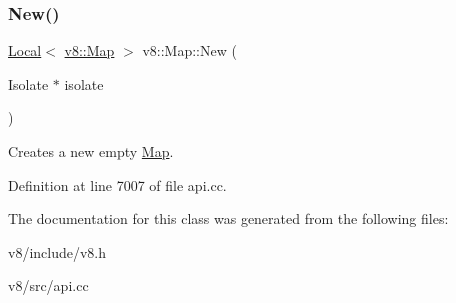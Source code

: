 \mbox{\label{classv8_1_1Map_a4126e8c0d6127119157986f1316380c2}} 
\subsubsection{\texorpdfstring{New()}{New()}}
{\footnotesize\ttfamily \mbox{\hyperlink{classv8_1_1Local}{Local}}$<$ \mbox{\hyperlink{classv8_1_1Map}{v8\+::\+Map}} $>$ v8\+::\+Map\+::\+New (\begin{DoxyParamCaption}\item[{Isolate $\ast$}]{isolate }\end{DoxyParamCaption})\hspace{0.3cm}{\ttfamily [static]}}

Creates a new empty \mbox{\hyperlink{classv8_1_1Map}{Map}}. 

Definition at line 7007 of file api.\+cc.



The documentation for this class was generated from the following files\+:\begin{DoxyCompactItemize}
\item 
v8/include/v8.\+h\item 
v8/src/api.\+cc\end{DoxyCompactItemize}
